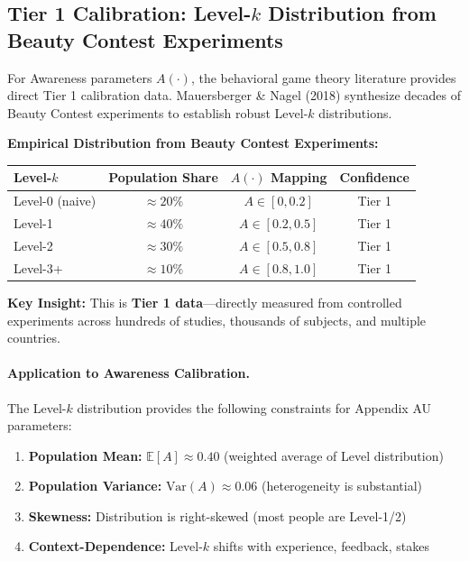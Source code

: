 \subsection{Tier 1 Calibration: Level-$k$ Distribution from Beauty Contest Experiments}
\label{sec:BBB-level-k}

For Awareness parameters $A(\cdot)$, the behavioral game theory literature provides
direct Tier 1 calibration data. Mauersberger \& Nagel (2018) synthesize decades of
Beauty Contest experiments to establish robust Level-$k$ distributions.

\begin{tcolorbox}[colback=green!5!white, colframe=green!75!black,
    title=\textbf{Tier 1 Source: Level-$k$ Distribution (Mauersberger \& Nagel 2018)}]

\textbf{Empirical Distribution from Beauty Contest Experiments:}

\begin{center}
\renewcommand{\arraystretch}{1.3}
\begin{tabular}{@{}lccc@{}}
\toprule
\textbf{Level-$k$} & \textbf{Population Share} & \textbf{$A(\cdot)$ Mapping} & \textbf{Confidence} \\
\midrule
Level-0 (naive) & $\approx 20\%$ & $A \in [0, 0.2]$ & Tier 1 \\
Level-1 & $\approx 40\%$ & $A \in [0.2, 0.5]$ & Tier 1 \\
Level-2 & $\approx 30\%$ & $A \in [0.5, 0.8]$ & Tier 1 \\
Level-3+ & $\approx 10\%$ & $A \in [0.8, 1.0]$ & Tier 1 \\
\bottomrule
\end{tabular}
\end{center}

\textbf{Key Insight:} This is \textbf{Tier 1 data}---directly measured from controlled experiments
across hundreds of studies, thousands of subjects, and multiple countries.

\end{tcolorbox}

\paragraph{Application to Awareness Calibration.}
The Level-$k$ distribution provides the following constraints for Appendix AU parameters:

\begin{enumerate}[nosep]
    \item \textbf{Population Mean:} $\mathbb{E}[A] \approx 0.40$ (weighted average of Level distribution)
    \item \textbf{Population Variance:} $\text{Var}(A) \approx 0.06$ (heterogeneity is substantial)
    \item \textbf{Skewness:} Distribution is right-skewed (most people are Level-1/2)
    \item \textbf{Context-Dependence:} Level-$k$ shifts with experience, feedback, stakes
\end{enumerate}

